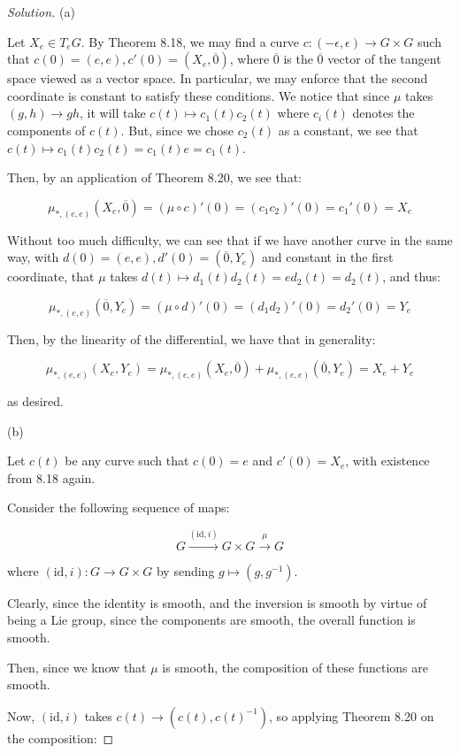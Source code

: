\documentclass[10pt]{article}
\begin{document}
\begin{proof}[Solution]

(a)

Let $X_e \in T_e G$. By Theorem 8.18, we may find a curve $c: (-\epsilon, \epsilon) \to G \times G$ such that $c(0) = (e,e), c'(0) = (X_e, \overline{0})$, where $\overline{0}$ is the $\overline{0}$ vector of the tangent space viewed as a vector space. In particular, we may enforce that the second coordinate is constant to satisfy these conditions. We notice that since $\mu$ takes $(g,h) \to gh$, it will take $c(t) \mapsto c_1(t) c_2(t)$ where $c_i(t)$ denotes the components of $c(t)$. But, since we chose $c_2(t)$ as a constant, we see that $c(t) \mapsto c_1(t) c_2(t) = c_1(t)e = c_1(t)$. 

Then, by an application of Theorem 8.20, we see that:

$$\mu_{*, (e,e)}(X_e, \overline{0}) = (\mu \circ c)'(0)  = (c_1c_2)'(0) = c_1'(0)= X_e$$

Without too much difficulty, we can see that if we have another curve in the same way, with $d(0) = (e,e), d'(0) = (\overline{0}, Y_e)$ and constant in the first coordinate, that $\mu$ takes $d(t) \mapsto d_1(t)d_2(t) = ed_2(t) = d_2(t)$, and thus:

$$ \mu_{*, (e,e)}(\overline{0}, Y_e) = (\mu \circ d)'(0)  = (d_1d_2)'(0) = d_2'(0)= Y_e$$

Then, by the linearity of the differential, we have that in generality:

$$\mu_{*, (e,e)}(X_e, Y_e) = \mu_{*, (e,e)}(X_e, \overline{0}) + \mu_{*, (e,e)}(\overline{0}, Y_e) = X_e + Y_e$$

as desired.

(b)

Let $c(t)$ be any curve such that $c(0) = e$ and $c'(0) = X_e$, with existence from 8.18 again.

Consider the following sequence of maps:

$$ G \xrightarrow{(\text{id}, i)} G \times G \xrightarrow{\mu} G $$

where $(\text{id}, i): G \to G \times G$ by sending $g \mapsto (g, g^{-1})$.

Clearly, since the identity is smooth, and the inversion is smooth by virtue of being a Lie group, since the components are smooth, the overall function is smooth.

Then, since we know that $\mu$ is smooth, the composition of these functions are smooth.

Now,  $(\text{id}, i)$ takes $c(t) \to (c(t), c(t)^{-1})$, so applying Theorem 8.20 on the composition:


\end{proof}
\end{document}
